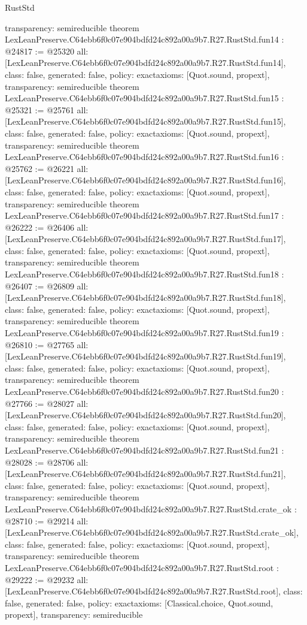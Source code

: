 \begin{lexlean}{RustStd}
\begin{coremodule}
{  transparency: semireducible
}
theorem LexLeanPreserve.C64ebb6f0c07e904bdfd24c892a00a9b7.R27.RustStd.fun14 : @24817 := @25320 {
  all: [LexLeanPreserve.C64ebb6f0c07e904bdfd24c892a00a9b7.R27.RustStd.fun14],
  class: false,
  generated: false,
  policy: exact{axioms: [Quot.sound, propext]},
  transparency: semireducible
}
theorem LexLeanPreserve.C64ebb6f0c07e904bdfd24c892a00a9b7.R27.RustStd.fun15 : @25321 := @25761 {
  all: [LexLeanPreserve.C64ebb6f0c07e904bdfd24c892a00a9b7.R27.RustStd.fun15],
  class: false,
  generated: false,
  policy: exact{axioms: [Quot.sound, propext]},
  transparency: semireducible
}
theorem LexLeanPreserve.C64ebb6f0c07e904bdfd24c892a00a9b7.R27.RustStd.fun16 : @25762 := @26221 {
  all: [LexLeanPreserve.C64ebb6f0c07e904bdfd24c892a00a9b7.R27.RustStd.fun16],
  class: false,
  generated: false,
  policy: exact{axioms: [Quot.sound, propext]},
  transparency: semireducible
}
theorem LexLeanPreserve.C64ebb6f0c07e904bdfd24c892a00a9b7.R27.RustStd.fun17 : @26222 := @26406 {
  all: [LexLeanPreserve.C64ebb6f0c07e904bdfd24c892a00a9b7.R27.RustStd.fun17],
  class: false,
  generated: false,
  policy: exact{axioms: [Quot.sound, propext]},
  transparency: semireducible
}
theorem LexLeanPreserve.C64ebb6f0c07e904bdfd24c892a00a9b7.R27.RustStd.fun18 : @26407 := @26809 {
  all: [LexLeanPreserve.C64ebb6f0c07e904bdfd24c892a00a9b7.R27.RustStd.fun18],
  class: false,
  generated: false,
  policy: exact{axioms: [Quot.sound, propext]},
  transparency: semireducible
}
theorem LexLeanPreserve.C64ebb6f0c07e904bdfd24c892a00a9b7.R27.RustStd.fun19 : @26810 := @27765 {
  all: [LexLeanPreserve.C64ebb6f0c07e904bdfd24c892a00a9b7.R27.RustStd.fun19],
  class: false,
  generated: false,
  policy: exact{axioms: [Quot.sound, propext]},
  transparency: semireducible
}
theorem LexLeanPreserve.C64ebb6f0c07e904bdfd24c892a00a9b7.R27.RustStd.fun20 : @27766 := @28027 {
  all: [LexLeanPreserve.C64ebb6f0c07e904bdfd24c892a00a9b7.R27.RustStd.fun20],
  class: false,
  generated: false,
  policy: exact{axioms: [Quot.sound, propext]},
  transparency: semireducible
}
theorem LexLeanPreserve.C64ebb6f0c07e904bdfd24c892a00a9b7.R27.RustStd.fun21 : @28028 := @28706 {
  all: [LexLeanPreserve.C64ebb6f0c07e904bdfd24c892a00a9b7.R27.RustStd.fun21],
  class: false,
  generated: false,
  policy: exact{axioms: [Quot.sound, propext]},
  transparency: semireducible
}
theorem LexLeanPreserve.C64ebb6f0c07e904bdfd24c892a00a9b7.R27.RustStd.crate_ok : @28710 := @29214 {
  all: [LexLeanPreserve.C64ebb6f0c07e904bdfd24c892a00a9b7.R27.RustStd.crate_ok],
  class: false,
  generated: false,
  policy: exact{axioms: [Quot.sound, propext]},
  transparency: semireducible
}
theorem LexLeanPreserve.C64ebb6f0c07e904bdfd24c892a00a9b7.R27.RustStd.root : @29222 := @29232 {
  all: [LexLeanPreserve.C64ebb6f0c07e904bdfd24c892a00a9b7.R27.RustStd.root],
  class: false,
  generated: false,
  policy: exact{axioms: [Classical.choice, Quot.sound, propext]},
  transparency: semireducible
}


\end{coremodule}
\end{lexlean}
